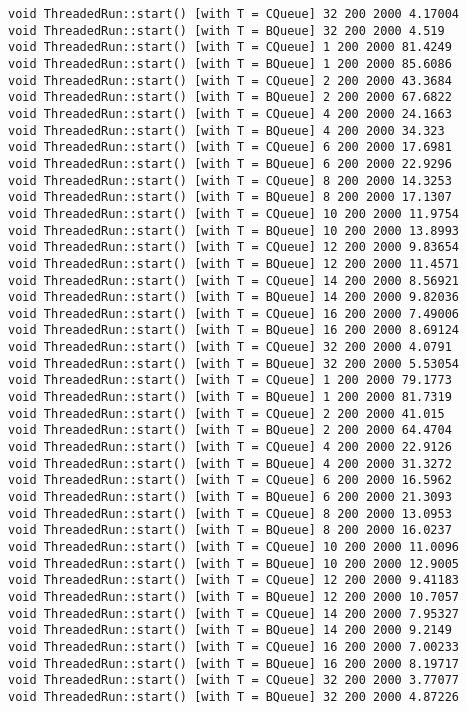 \begin{verbatim}
void ThreadedRun::start() [with T = CQueue] 32 200 2000 4.17004
void ThreadedRun::start() [with T = BQueue] 32 200 2000 4.519
void ThreadedRun::start() [with T = CQueue] 1 200 2000 81.4249
void ThreadedRun::start() [with T = BQueue] 1 200 2000 85.6086
void ThreadedRun::start() [with T = CQueue] 2 200 2000 43.3684
void ThreadedRun::start() [with T = BQueue] 2 200 2000 67.6822
void ThreadedRun::start() [with T = CQueue] 4 200 2000 24.1663
void ThreadedRun::start() [with T = BQueue] 4 200 2000 34.323
void ThreadedRun::start() [with T = CQueue] 6 200 2000 17.6981
void ThreadedRun::start() [with T = BQueue] 6 200 2000 22.9296
void ThreadedRun::start() [with T = CQueue] 8 200 2000 14.3253
void ThreadedRun::start() [with T = BQueue] 8 200 2000 17.1307
void ThreadedRun::start() [with T = CQueue] 10 200 2000 11.9754
void ThreadedRun::start() [with T = BQueue] 10 200 2000 13.8993
void ThreadedRun::start() [with T = CQueue] 12 200 2000 9.83654
void ThreadedRun::start() [with T = BQueue] 12 200 2000 11.4571
void ThreadedRun::start() [with T = CQueue] 14 200 2000 8.56921
void ThreadedRun::start() [with T = BQueue] 14 200 2000 9.82036
void ThreadedRun::start() [with T = CQueue] 16 200 2000 7.49006
void ThreadedRun::start() [with T = BQueue] 16 200 2000 8.69124
void ThreadedRun::start() [with T = CQueue] 32 200 2000 4.0791
void ThreadedRun::start() [with T = BQueue] 32 200 2000 5.53054
void ThreadedRun::start() [with T = CQueue] 1 200 2000 79.1773
void ThreadedRun::start() [with T = BQueue] 1 200 2000 81.7319
void ThreadedRun::start() [with T = CQueue] 2 200 2000 41.015
void ThreadedRun::start() [with T = BQueue] 2 200 2000 64.4704
void ThreadedRun::start() [with T = CQueue] 4 200 2000 22.9126
void ThreadedRun::start() [with T = BQueue] 4 200 2000 31.3272
void ThreadedRun::start() [with T = CQueue] 6 200 2000 16.5962
void ThreadedRun::start() [with T = BQueue] 6 200 2000 21.3093
void ThreadedRun::start() [with T = CQueue] 8 200 2000 13.0953
void ThreadedRun::start() [with T = BQueue] 8 200 2000 16.0237
void ThreadedRun::start() [with T = CQueue] 10 200 2000 11.0096
void ThreadedRun::start() [with T = BQueue] 10 200 2000 12.9005
void ThreadedRun::start() [with T = CQueue] 12 200 2000 9.41183
void ThreadedRun::start() [with T = BQueue] 12 200 2000 10.7057
void ThreadedRun::start() [with T = CQueue] 14 200 2000 7.95327
void ThreadedRun::start() [with T = BQueue] 14 200 2000 9.2149
void ThreadedRun::start() [with T = CQueue] 16 200 2000 7.00233
void ThreadedRun::start() [with T = BQueue] 16 200 2000 8.19717
void ThreadedRun::start() [with T = CQueue] 32 200 2000 3.77077
void ThreadedRun::start() [with T = BQueue] 32 200 2000 4.87226

\end{verbatim}
